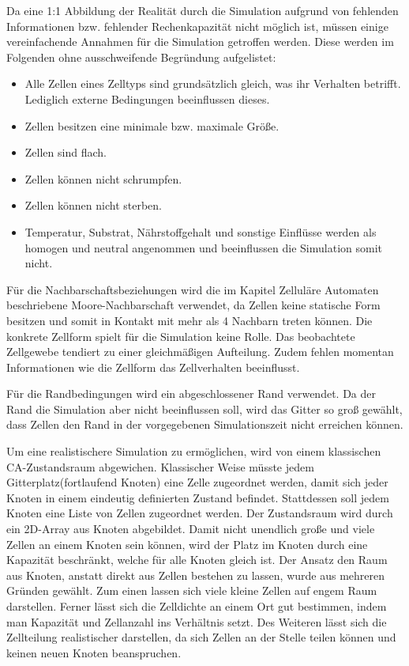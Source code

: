 \documentclass[11pt,a4paper,pointlessnumbers]{scrreprt}  %
\begin{document}
Da eine 1:1 Abbildung der Realität durch die Simulation aufgrund von fehlenden Informationen bzw. fehlender Rechenkapazität nicht möglich ist, müssen einige vereinfachende Annahmen für die Simulation getroffen werden. Diese werden im Folgenden ohne ausschweifende Begründung aufgelistet:

\begin{itemize}
	\item Alle Zellen eines Zelltyps sind grundsätzlich gleich, was ihr Verhalten betrifft. Lediglich externe Bedingungen beeinflussen dieses.
	\item Zellen besitzen eine minimale bzw. maximale Größe.
	\item Zellen sind flach.
	\item Zellen können nicht schrumpfen.
	\item Zellen können nicht sterben.
	\item Temperatur, Substrat, Nährstoffgehalt und sonstige Einflüsse werden als homogen und neutral angenommen und beeinflussen die Simulation somit nicht.
\end{itemize}

Für die Nachbarschaftsbeziehungen wird die im Kapitel Zelluläre Automaten beschriebene Moore-Nachbarschaft verwendet, da Zellen keine statische Form besitzen und somit in Kontakt mit mehr als 4 Nachbarn treten können. Die konkrete Zellform spielt für die Simulation keine Rolle. Das beobachtete Zellgewebe tendiert zu einer gleichmäßigen Aufteilung. Zudem fehlen momentan Informationen wie die Zellform das Zellverhalten beeinflusst.\par 

Für die Randbedingungen wird ein abgeschlossener Rand verwendet. Da der Rand die Simulation aber nicht beeinflussen soll, wird das Gitter so groß gewählt, dass Zellen den Rand in der vorgegebenen Simulationszeit nicht erreichen können. \par 

Um eine realistischere Simulation zu ermöglichen, wird von einem klassischen CA-Zustandsraum abgewichen. Klassischer Weise müsste jedem Gitterplatz(fortlaufend Knoten) eine Zelle zugeordnet werden, damit sich jeder Knoten in einem eindeutig definierten Zustand befindet. Stattdessen soll jedem Knoten eine Liste von Zellen zugeordnet werden. Der Zustandsraum wird durch ein 2D-Array aus Knoten abgebildet. Damit nicht unendlich große und viele Zellen an einem Knoten sein können, wird der Platz im Knoten durch eine Kapazität beschränkt, welche für alle Knoten gleich ist. Der Ansatz den Raum aus Knoten, anstatt direkt aus Zellen bestehen zu lassen, wurde aus mehreren Gründen gewählt. Zum einen lassen sich viele kleine Zellen auf engem Raum darstellen. Ferner lässt sich die Zelldichte an einem Ort gut bestimmen, indem man Kapazität und Zellanzahl ins Verhältnis setzt. Des Weiteren lässt sich die Zellteilung realistischer darstellen, da sich Zellen an der Stelle teilen können und keinen neuen Knoten beanspruchen. \par
\end{document}

